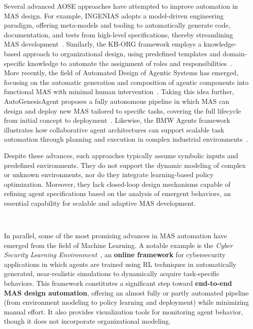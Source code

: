 \documentclass[pdflatex,sn-mathphys-num]{sn-jnl}%
\theoremstyle{thmstyleone}%
\theoremstyle{thmstyletwo}%
\theoremstyle{thmstylethree}%
\begin{document}
Several advanced AOSE approaches have attempted to improve automation in MAS design. For example, INGENIAS adopts a model-driven engineering paradigm, offering meta-models and tooling to automatically generate code, documentation, and tests from high-level specifications, thereby streamlining MAS development~\cite{Pavon2003}. Similarly, the KB-ORG framework employs a knowledge-based approach to organizational design, using predefined templates and domain-specific knowledge to automate the assignment of roles and responsibilities~\cite{Sims2008}. More recently, the field of Automated Design of Agentic Systems has emerged, focusing on the automatic generation and composition of agentic components into functional MAS with minimal human intervention~\cite{smith2024automated}. Taking this idea further, AutoGenesisAgent proposes a fully autonomous pipeline in which MAS can design and deploy new MAS tailored to specific tasks, covering the full lifecycle from initial concept to deployment~\cite{harper2024autogenesisagent}. Likewise, the BMW Agents framework illustrates how collaborative agent architectures can support scalable task automation through planning and execution in complex industrial environments~\cite{crawford2024bmw}.

Despite these advances, such approaches typically assume symbolic inputs and predefined environments. They do not support the dynamic modeling of complex or unknown environments, nor do they integrate learning-based policy optimization. Moreover, they lack closed-loop design mechanisms capable of refining agent specifications based on the analysis of emergent behaviors, an essential capability for scalable and adaptive MAS development.

\

\noindent In parallel, some of the most promising advances in MAS automation have emerged from the field of Machine Learning. A notable example is the \textit{Cyber Security Learning Environment}~\cite{hammar2023scalable}, an \textbf{online framework} for cybersecurity applications in which agents are trained using RL techniques in automatically generated, near-realistic simulations to dynamically acquire task-specific behaviors. This framework constitutes a significant step toward \textbf{end-to-end MAS design automation}, offering an almost fully or partly automated pipeline (from environment modeling to policy learning and deployment) while minimizing manual effort. It also provides visualization tools for monitoring agent behavior, though it does not incorporate organizational modeling.
\end{document}
